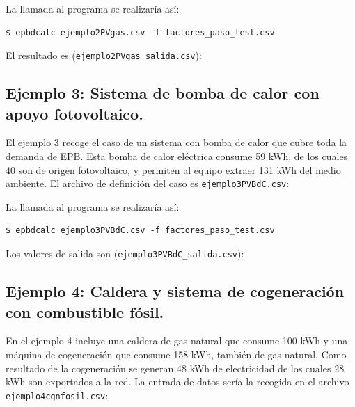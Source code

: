 \documentclass[10pt,notitlepage,oneside,a4paper]{article}
\begin{document}
La llamada al programa se realizaría así:

\begin{Verbatim}[fontsize=\small]
    $ epbdcalc ejemplo2PVgas.csv -f factores_paso_test.csv
\end{Verbatim}

El resultado es (\texttt{ejemplo2PVgas\_salida.csv}):


\subsection{Ejemplo 3: Sistema de bomba de calor con apoyo fotovoltaico.}
El ejemplo 3 recoge el caso de un sistema con bomba de calor que cubre toda la demanda de EPB. Esta bomba de calor eléctrica consume 59 kWh, de los cuales 40 son de origen fotovoltaico, y permiten al equipo extraer 131 kWh del medio ambiente. El archivo de definición del caso es \texttt{ejemplo3PVBdC.csv}:


La llamada al programa se realizaría así:

\begin{Verbatim}[fontsize=\small]
    $ epbdcalc ejemplo3PVBdC.csv -f factores_paso_test.csv
\end{Verbatim}

Los valores de salida son (\texttt{ejemplo3PVBdC\_salida.csv}):


\subsection{Ejemplo 4: Caldera y sistema de cogeneración con combustible fósil.}
En el ejemplo 4 incluye una caldera de gas natural que consume 100 kWh y una máquina de cogeneración que consume 158 kWh, también de gas natural. Como resultado de la cogeneración se generan 48 kWh de electricidad de los cuales 28 kWh son exportados a la red. La entrada de datos sería la recogida en el archivo \texttt{ejemplo4cgnfosil.csv}:

\end{document}
